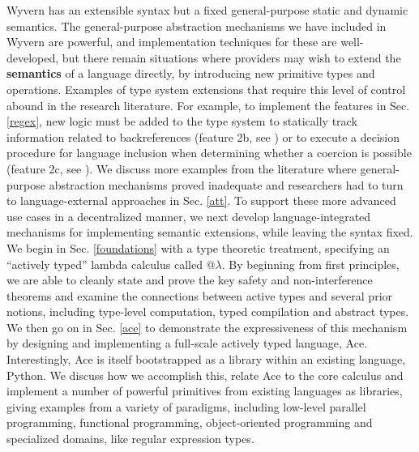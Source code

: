 Wyvern has an extensible syntax but a fixed general-purpose static and dynamic semantics. The general-purpose abstraction mechanisms we have included in Wyvern are powerful, and implementation techniques for these are well-developed, but there remain situations where providers may wish to extend the \textbf{semantics} of a language directly, by introducing new primitive types and operations. Examples of type system extensions that require this level of control abound in the research literature. For example, to implement the features in Sec. \ref{regex}, new logic must be added to the type system to statically track information related to backreferences (feature 2b, see \cite{spishak2012type}) or to execute a decision procedure for language inclusion when determining whether a coercion is possible (feature 2c, see \cite{fulton-thesis}). We discuss more examples from the literature where general-purpose abstraction mechanisms proved inadequate and researchers had to turn to language-external approaches in Sec. \ref{att}. To support these more advanced use cases in a decentralized manner, we next develop language-integrated mechanisms for implementing semantic extensions, while leaving the syntax fixed. We begin in Sec. \ref{foundations} with a type theoretic treatment, specifying an ``actively typed'' lambda calculus called @$\lambda$. By beginning from first principles, we are able to cleanly state and prove the key safety and non-interference theorems and examine the connections between active types and several prior notions, including type-level computation, typed compilation and abstract types. We then go on in Sec. \ref{ace} to demonstrate the expressiveness of this mechanism by designing and implementing a full-scale actively typed language, Ace. Interestingly, Ace is itself bootstrapped as a library within an existing language, Python. We discuss how we accomplish this, relate Ace to the core calculus and implement a number of powerful primitives from existing languages as libraries, giving examples from a variety of paradigms, including low-level parallel programming, functional programming, object-oriented programming and specialized domains, like regular expression types.

